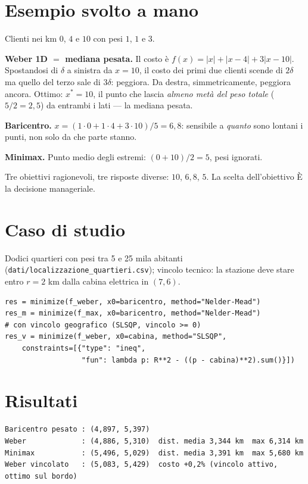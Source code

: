 \section{Esempio svolto a mano}

\begin{esempio}
Clienti nei km $0$, $4$ e $10$ con pesi $1$, $1$ e $3$.

\textbf{Weber 1D $=$ mediana pesata.} Il costo è
$f(x) = |x| + |x - 4| + 3|x - 10|$. Spostandosi di $\delta$ a sinistra da $x = 10$,
il costo dei primi due clienti scende di $2\delta$ ma quello del terzo sale di
$3\delta$: peggiora. Da destra, simmetricamente, peggiora ancora. Ottimo: $x^* = 10$,
il punto che lascia \emph{almeno metà del peso totale} ($5/2 = 2{,}5$) da entrambi i
lati --- la mediana pesata.

\textbf{Baricentro.} $x = (1 \cdot 0 + 1 \cdot 4 + 3 \cdot 10)/5 = 6{,}8$:
sensibile a \emph{quanto} sono lontani i punti, non solo da che parte stanno.

\textbf{Minimax.} Punto medio degli estremi: $(0 + 10)/2 = 5$, pesi ignorati.

Tre obiettivi ragionevoli, tre risposte diverse: $10$, $6{,}8$, $5$. La scelta
dell'obiettivo È la decisione manageriale.
\end{esempio}

\section{Caso di studio}

Dodici quartieri con pesi tra 5 e 25 mila abitanti
(\texttt{dati/localizzazione\_quartieri.csv}); vincolo tecnico: la stazione deve
stare entro $r = 2$ km dalla cabina elettrica in $(7, 6)$.

\begin{lstlisting}[style=python]
res = minimize(f_weber, x0=baricentro, method="Nelder-Mead")
res_m = minimize(f_max, x0=baricentro, method="Nelder-Mead")
# con vincolo geografico (SLSQP, vincolo >= 0)
res_v = minimize(f_weber, x0=cabina, method="SLSQP",
    constraints=[{"type": "ineq",
                  "fun": lambda p: R**2 - ((p - cabina)**2).sum()}])
\end{lstlisting}

\section{Risultati}

\begin{lstlisting}[style=output]
Baricentro pesato : (4,897, 5,397)
Weber             : (4,886, 5,310)  dist. media 3,344 km  max 6,314 km
Minimax           : (5,496, 5,029)  dist. media 3,391 km  max 5,680 km
Weber vincolato   : (5,083, 5,429)  costo +0,2% (vincolo attivo, ottimo sul bordo)
\end{lstlisting}

